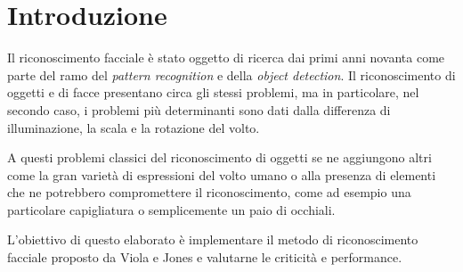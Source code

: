 \section{Introduzione}

Il riconoscimento facciale è stato oggetto di ricerca dai primi anni novanta come parte del ramo del \emph{pattern recognition} e della \emph{object detection}. Il riconoscimento di oggetti e di facce presentano circa gli stessi problemi, ma in particolare, nel secondo caso, i problemi più determinanti sono dati dalla differenza di illuminazione, la scala e la rotazione del volto. 

A questi problemi classici del riconoscimento di oggetti se ne aggiungono altri come la gran varietà di espressioni del volto umano o alla presenza di elementi che ne potrebbero compromettere il riconoscimento, come ad esempio una particolare capigliatura o semplicemente un paio di occhiali.

L'obiettivo di questo elaborato è implementare il metodo di riconoscimento facciale proposto da Viola e Jones \cite{Viola:2004:RRF:966432.966458} e valutarne le criticità e performance.